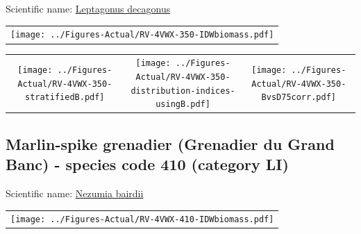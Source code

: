 \documentclass[12pt]{article}\usepackage[]{graphicx}\usepackage[]{color}
\begin{document}
  


Scientific name: \href{http://www.marinespecies.org/aphia.php?p=taxdetails\&id=127191}{Leptagonus decagonus} \newline
\begin{minipage}{1.0\textwidth}
 \begin{tabular}{c}
\texttt{[image: ../Figures-Actual/RV-4VWX-350-IDWbiomass.pdf]} \\ 
\end{tabular} 
\end{minipage}
\newline

\vspace{1cm}
\begin{minipage}{1.0\textwidth}
 \begin{tabular}{ccc}
\texttt{[image: ../Figures-Actual/RV-4VWX-350-stratifiedB.pdf]} & 
\texttt{[image: ../Figures-Actual/RV-4VWX-350-distribution-indices-usingB.pdf]} & 
\texttt{[image: ../Figures-Actual/RV-4VWX-350-BvsD75corr.pdf]} \\ 
\end{tabular} 
\end{minipage}
\clearpage

\renewcommand\thefigure{\thesubsection\Alph{figure}}

\setcounter{figure}{0}

\hypertarget{sec:410}{%
\subsection{Marlin-spike grenadier (Grenadier du Grand Banc) - species code 410 (category LI)}\label{sec:410}}

  


Scientific name: \href{http://www.marinespecies.org/aphia.php?p=taxdetails\&id=183289}{Nezumia bairdii} \newline
\begin{minipage}{1.0\textwidth}
 \begin{tabular}{c}
\texttt{[image: ../Figures-Actual/RV-4VWX-410-IDWbiomass.pdf]} \\ 
\end{tabular} 
\end{minipage}
\newline
\end{document}
